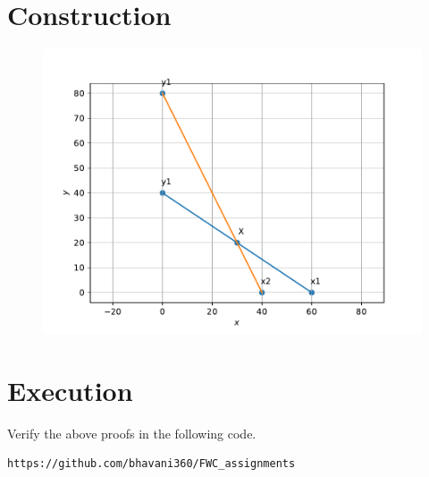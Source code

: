 \documentclass[journal,10pt]{article}
\begin{document}
\section*{Construction}
\begin{figure}[h]
\includegraphics[scale=0.5]{op1.pdf} 
\end{figure}
\section*{Execution}
Verify the above proofs in the following code.\\
\begin{lstlisting}
https://github.com/bhavani360/FWC_assignments
\end{lstlisting}
 
\end{document}

